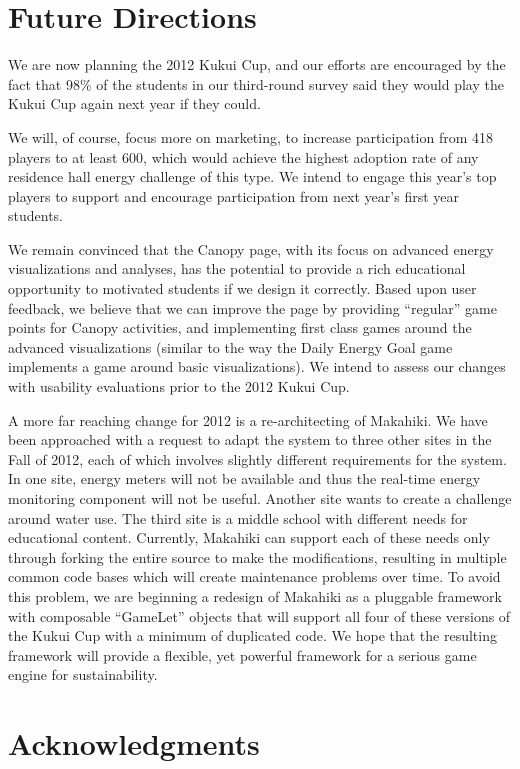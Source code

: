 \documentclass{acm_proc_article-sp}
\begin{document}
\section{Future Directions}

We are now planning the 2012 Kukui Cup, and our efforts are encouraged
by the fact that 98\% of the students in our third-round survey said they
would play the Kukui Cup again next year if they could.

We will, of course, focus more on marketing, to increase participation from 418
players to at least 600, which would achieve the highest adoption rate of any
residence hall energy challenge of this type.  We intend to engage this year's
top players to support and encourage participation from next year's first year
students.

We remain convinced that the Canopy page, with its focus on advanced energy
visualizations and analyses, has the potential to provide a rich
educational opportunity to motivated students if we design it
correctly.  Based upon user feedback, we believe that we can improve the
page by providing ``regular'' game points for Canopy activities, and
implementing first class games around the advanced visualizations (similar
to the way the Daily Energy Goal game implements a game around basic
visualizations).  We intend to assess our changes with usability
evaluations prior to the 2012 Kukui Cup.

A more far reaching change for 2012 is a re-architecting of Makahiki.  We have
been approached with a request to adapt the system to three other sites in the
Fall of 2012, each of which involves slightly different requirements for the
system. In one site, energy meters will not be available and thus the real-time
energy monitoring component will not be useful. Another site wants to create a
challenge around water use.  The third site is a middle school with different
needs for educational content. Currently, Makahiki can support each of these
needs only through forking the entire source to make the modifications,
resulting in multiple common code bases which will create maintenance problems
over time.  To avoid this problem, we are beginning a redesign of Makahiki as a
pluggable framework with composable ``GameLet'' objects that will support all
four of these versions of the Kukui Cup with a minimum of duplicated code.  We
hope that the resulting framework will provide a flexible, yet powerful
framework for a serious game engine for sustainability.

\section{Acknowledgments}
\end{document}
